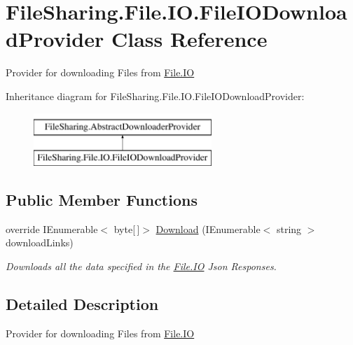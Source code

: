 \hypertarget{class_file_sharing_1_1_file_1_1_i_o_1_1_file_i_o_download_provider}{}\section{File\+Sharing.\+File.\+I\+O.\+File\+I\+O\+Download\+Provider Class Reference}
\label{class_file_sharing_1_1_file_1_1_i_o_1_1_file_i_o_download_provider}


Provider for downloading Files from \hyperlink{namespace_file_sharing_1_1_file_1_1_i_o}{File.\+IO}  


Inheritance diagram for File\+Sharing.\+File.\+I\+O.\+File\+I\+O\+Download\+Provider\+:\begin{figure}[H]
\begin{center}
\leavevmode
\includegraphics[height=2.000000cm]{class_file_sharing_1_1_file_1_1_i_o_1_1_file_i_o_download_provider}
\end{center}
\end{figure}
\subsection*{Public Member Functions}
\begin{DoxyCompactItemize}
\item 
override I\+Enumerable$<$ byte\mbox{[}$\,$\mbox{]}$>$ \hyperlink{class_file_sharing_1_1_file_1_1_i_o_1_1_file_i_o_download_provider_a20619028413c369ac0cc064b610d5c0e}{Download} (I\+Enumerable$<$ string $>$ download\+Links)
\begin{DoxyCompactList}\small\item\em Downloads all the data specified in the \hyperlink{namespace_file_sharing_1_1_file_1_1_i_o}{File.\+IO} Json Responses. \end{DoxyCompactList}\end{DoxyCompactItemize}


\subsection{Detailed Description}
Provider for downloading Files from \hyperlink{namespace_file_sharing_1_1_file_1_1_i_o}{File.\+IO} 



